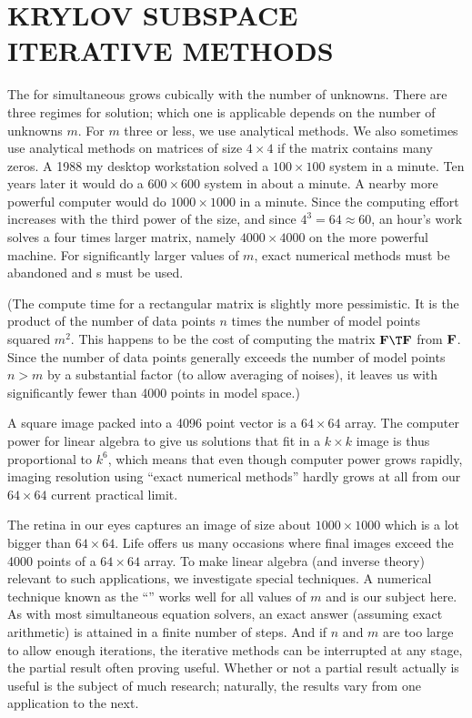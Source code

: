 \section{KRYLOV SUBSPACE ITERATIVE METHODS}
The  for simultaneous 
grows cubically with the number of unknowns.
There are three regimes for solution;
which one is applicable
depends on the number of unknowns $m$.
For $m$ three or less, we use analytical methods.
We also sometimes use analytical methods on matrices of size $4\times 4$
if the matrix contains many zeros.
A 1988 my desktop workstation solved a $100 \times 100$
system in a minute.
Ten years later it would do a $600\times 600$ system in about a minute.
A nearby more powerful computer would do
$1000\times 1000$ in a minute.
Since the computing effort increases with the third power of the size,
and since $4^3=64\approx 60$,
an hour's work solves a four times larger matrix,
namely $4000\times 4000$ on the more powerful machine.
For significantly larger values of $m$,
exact numerical methods must be abandoned
and s must be used.
\par
(The compute time for a rectangular matrix is slightly more pessimistic.
It is the product of the number of data points $n$
times the number of model points squared $m^2$.
This happens to be the cost of computing the matrix
$\bold F\T\bold F$ from $\bold F$.
Since the number of data points generally exceeds the number of model
points $n>m$ by a substantial factor
(to allow averaging of noises),
it leaves us with significantly fewer than 4000 points in model space.)
\par
A square image packed into a 4096 point vector is a $64\times 64$ array.
The computer power for linear algebra to give us solutions that
fit in a $k\times k$ image is thus proportional
to $k^6$, which means that even though computer power grows rapidly,
imaging resolution using ``exact numerical methods'' hardly
grows at all from our $64\times 64$ current practical limit.

\par
The retina in our eyes captures an image of size about $1000\times 1000$
which is a lot bigger than $64\times 64$.
Life offers us many occasions where final images exceed the 4000
points of a $64\times 64$ array.
To make linear algebra (and inverse theory) relevant to such applications,
we investigate special techniques.
A numerical technique known as the
``''
works well for all values of $m$ and is our subject here.
As with most simultaneous equation solvers,
an exact answer (assuming exact arithmetic)
is attained in a finite number of steps.
And if $n$ and $m$ are too large to allow enough iterations,
the iterative methods can be interrupted at any stage,
the partial result often proving useful.
Whether or not a partial result actually is useful
is the subject of much research;
naturally, the results vary from one application to the next.

